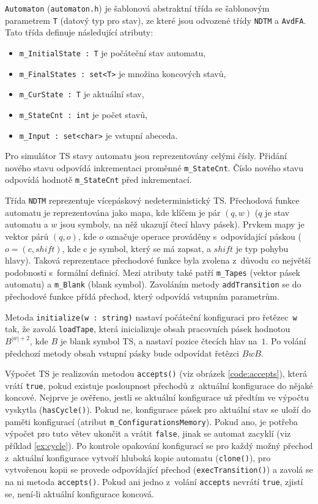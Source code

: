 \documentclass[thesis=B,czech]{FITthesis}[2019/12/23]
\theoremstyle{definition}
\begin{document}
\texttt{Automaton} (\texttt{automaton.h}) je šablonová abstraktní třída se šablonovým parametrem \texttt{T} (datový typ pro stav), ze které jsou odvozené třídy \texttt{NDTM} a \texttt{AvdFA}. Tato třída definuje následující atributy: 
\begin{itemize} 
	\item{\texttt{m\_InitialState : T} je počáteční stav automatu,}
	\item{\texttt{m\_FinalStates : set<T>} je množina koncových stavů,}
	\item{\texttt{m\_CurState : T} je aktuální stav,}
	\item{\texttt{m\_StateCnt : int} je počet stavů,}
	\item{\texttt{m\_Input : set<char>} je vstupní abeceda.}
\end{itemize}
Pro simulátor TS stavy automatu jsou reprezentovány celými čísly. Přidání nového stavu odpovídá inkrementaci proměnné \texttt{m\_StateCnt}. Číslo nového stavu odpovídá hodnotě \texttt{m\_StateCnt} před inkrementací.

Třída \texttt{NDTM} reprezentuje vícepáskový nedeterministický TS. Přechodová funkce automatu je reprezentována jako mapa, kde klíčem je pár $(q, w)$ ($q$ je stav automatu a $w$ jsou symboly, na něž ukazují čtecí hlavy pásek). Prvkem mapy je vektor párů $(q, o)$, kde $o$ označuje operace prováděny s~odpovídající páskou ($o = (c, shift)$, kde c je symbol, který se má zapsat, a $shift$ je typ pohybu hlavy). Taková reprezentace přechodové funkce byla zvolena z~důvodu co největší podobnosti s~formální definicí. Mezi atributy také patří \texttt{m\_Tapes} (vektor pásek automatu) a \texttt{m\_Blank} (blank symbol). Zavoláním metody \texttt{addTransition} se do přechodové funkce přídá přechod, který odpovídá vstupním parametrům.

Metoda \texttt{initialize(w : string)} nastaví počáteční konfiguraci pro řetězec~\texttt{w} tak, že zavolá \texttt{loadTape}, která inicializuje obsah pracovních pásek hodnotou $B^{|w|+2}$, kde $B$ je blank symbol TS, a nastaví pozice čtecích hlav na~$1$. Po volání předchozí metody obsah vstupní pásky bude odpovídat řetězci $BwB$. 

Výpočet TS je realizován metodou \texttt{accepts()} (viz obrázek \ref{code:accepts}), která vrátí \texttt{true}, pokud existuje posloupnost přechodů z~aktuální konfigurace do nějaké koncové. Nejprve je ověřeno, jestli se aktuální konfigurace už předtím ve výpočtu vyskytla (\texttt{hasCycle()}). Pokud ne, konfigurace pásek pro aktuální stav se uloží do paměti konfigurací (atribut \texttt{m\_ConfigurationsMemory}). Pokud ano, je potřeba výpočet pro tuto větev ukončit a vrátit \texttt{false}, jinak se automat zacyklí (viz příklad \ref{ex:cycle}). Po kontrole opakování konfigurací se pro každý možný přechod z~aktuální konfigurace vytvoří hluboká kopie automatu (\texttt{clone()}), pro vytvořenou kopii se provede odpovídající přechod (\texttt{execTransition()}) a zavolá se na ni metoda \texttt{accepts()}. Pokud ani jedno z~volání \texttt{accepts} nevrátí \texttt{true}, zjistí se, není-li aktuální konfigurace koncová. 
\end{document}
